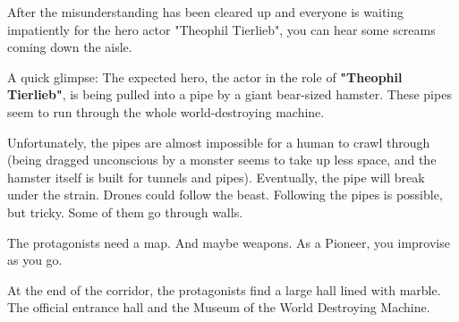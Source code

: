 After the misunderstanding has been cleared up and everyone is waiting impatiently for the hero actor "Theophil Tierlieb", you can hear some screams coming down the aisle.

A quick glimpse: The expected hero, the actor in the role of \textbf{"Theophil Tierlieb"}, is being pulled into a pipe by a giant bear-sized hamster. These pipes seem to run through the whole world-destroying machine.

Unfortunately, the pipes are almost impossible for a human to crawl through (being dragged unconscious by a monster seems to take up less space, and the hamster itself is built for tunnels and pipes). Eventually, the pipe will break under the strain. Drones could follow the beast. Following the pipes is possible, but tricky. Some of them go through walls.

The protagonists need a map. And maybe weapons. As a Pioneer, you improvise as you go.

At the end of the corridor, the protagonists find a large hall lined with marble. The official entrance hall and the Museum of the World Destroying Machine.

